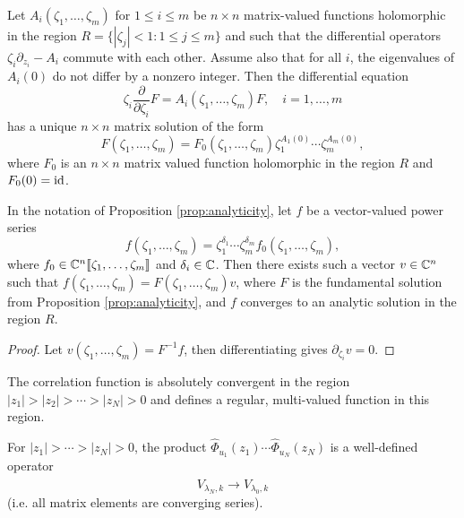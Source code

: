 \begin{prop}\label{prop:analyticity}
  Let $A_i(\zeta_1, \dots, \zeta_m)$
  for $1 \le i \le m$ be $n \times n$
  matrix-valued
  functions holomorphic in the region
  $R = \{|\zeta_j| < 1 : 1 \le j \le m\}$ and
  such that the differential operators
  $\zeta_i \partial_{z_i} - A_i$ commute
  with each other. Assume also that for all
  $i$, the eigenvalues of $A_i(0)$ do not
  differ by a nonzero integer. Then
  the differential equation
  \[
    \zeta_i \frac{\partial}{\partial \zeta_i} F = A_i(\zeta_1, \dots, \zeta_m) F, \quad
    i = 1, \dots, m
  \]
  has a unique $n \times n$ matrix solution
  of the form
  \[
    F(\zeta_1, \dots, \zeta_m)
    = F_0(\zeta_1, \dots, \zeta_m)
    \zeta_1^{A_1(0)} \cdots \zeta_m^{A_m(0)},
  \]
  where $F_0$ is an $n \times n$ matrix
  valued function holomorphic in the region
  $R$ and $F_0(0) = \operatorname{id}$.
\end{prop}

\begin{corollary}
  In the notation of Proposition
  \ref{prop:analyticity}, let $f$ be a
  vector-valued power series
  \[
    f(\zeta_1, \dots, \zeta_m)
    = \zeta_1^{\delta_1} \cdots \zeta_m^{\delta_m}
    f_0(\zeta_1, \dots, \zeta_m),
  \]
  where $f_0 \in \mathbb{C}^n \llbracket \zeta_1, \dots, \zeta_m \rrbracket$
  and $\delta_i \in \mathbb{C}$. Then there exists
  such a vector $v \in \mathbb{C}^n$ such that
  $f(\zeta_1, \dots, \zeta_m) = F(\zeta_1, \dots, \zeta_m) v$,
  where $F$ is the fundamental solution
  from Proposition \ref{prop:analyticity},
  and $f$ converges to an analytic
  solution in the region $R$.
\end{corollary}

\begin{proof}
  Let $v(\zeta_1, \dots, \zeta_m) = F^{-1} f$,
  then differentiating gives
  $\partial_{\zeta_i} v = 0$.
\end{proof}

\begin{theorem}
  The correlation function is absolutely
  convergent in the region
  $|z_1| > |z_2| > \cdots > |z_N| > 0$ and
  defines a regular, multi-valued function
  in this region.
\end{theorem}

\begin{corollary}
  For $|z_1| > \cdots > |z_N| > 0$, the
  product $\widehat{\Phi}_{u_1}(z_1) \cdots \widehat{\Phi}_{u_N}(z_N)$
  is a well-defined operator
  \[
    V_{\lambda_N, k}
    \longrightarrow
    \widehat{V}_{\lambda_0, k}
  \]
  (i.e. all matrix elements are converging
  series).
\end{corollary}

